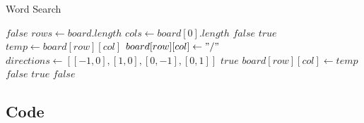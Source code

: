 \documentclass[11pt]{article}
\begin{document}
\begin{algorithm}
    \caption{Word Search}
    \label{alg:wordSearch}
    \begin{algorithmic}[1]
                \State \Return $false$
            \EndIf
            \State $rows \gets board.length$
            \State $cols \gets board[0].length$
                    \State \Return $false$
                \EndIf
                    \State \Return $true$
                \EndIf
                \State $temp \gets board[row][col]$
                \State $board[row][col] \gets "/"$
                \State $directions \gets [[-1, 0], [1, 0], [0, -1], [0, 1]]$
                        \State \Return $true$
                    \EndIf
                \EndFor
                \State $board[row][col] \gets temp$
                \State \Return $false$
            \EndProcedure
                        \State \Return $true$
                    \EndIf
                \EndFor
            \EndFor
            \State \Return $false$
        \EndProcedure
    \end{algorithmic}
\end{algorithm}

\subsection{Code}
\end{document}
